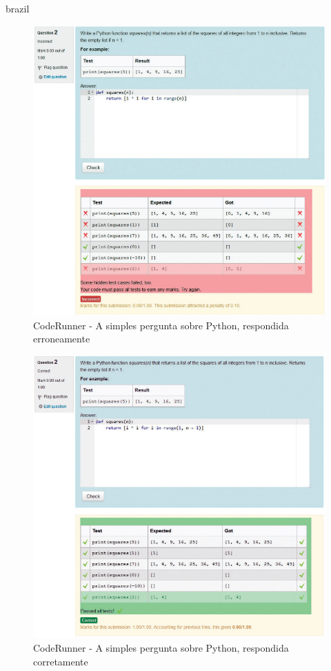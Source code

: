 \begin{otherlanguage*}{brazil}
\begin{figure}[h!]
	   \centering
            \caption{CodeRunner - A simples pergunta sobre Python, respondida erroneamente}
            \label{fig:ModeloConceitual}
	   	\includegraphics[scale=0.4]{pictures/CodeRunner_errada.png}
\end{figure}

\begin{figure}[h!]
	   \centering
            \caption{CodeRunner - A simples pergunta sobre Python, respondida corretamente}
            \label{fig:ModeloConceitual}
	   	\includegraphics[scale=0.4]{pictures/CodeRunner_correta.png}
\end{figure}


\end{otherlanguage*}
